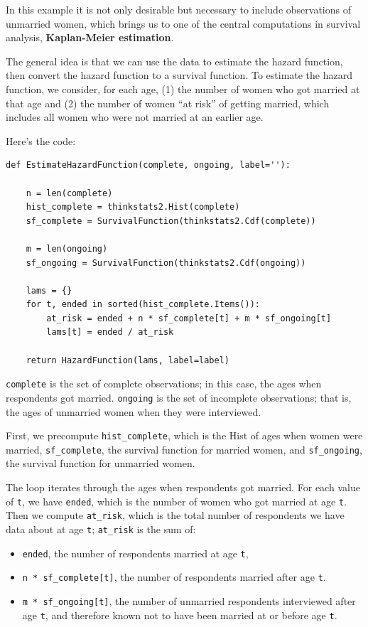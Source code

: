 \documentclass[12pt]{book}
\begin{document}
In this example it is not only desirable but necessary to include
observations of unmarried women, which brings us to one of the central
computations in survival analysis, {\bf Kaplan-Meier estimation}.

The general idea is that we can use the data to estimate the hazard
function, then convert the hazard function to a survival function.
To estimate the hazard function, we consider, for each age,
(1) the number of women who got married at that age and (2) the number
of women ``at risk'' of getting married, which includes all women
who were not married at an earlier age.

Here's the code:

\begin{verbatim}
def EstimateHazardFunction(complete, ongoing, label=''):

    n = len(complete)
    hist_complete = thinkstats2.Hist(complete)
    sf_complete = SurvivalFunction(thinkstats2.Cdf(complete))

    m = len(ongoing)
    sf_ongoing = SurvivalFunction(thinkstats2.Cdf(ongoing))

    lams = {}
    for t, ended in sorted(hist_complete.Items()):
        at_risk = ended + n * sf_complete[t] + m * sf_ongoing[t]
        lams[t] = ended / at_risk

    return HazardFunction(lams, label=label)
\end{verbatim}

{\tt complete} is the set of complete observations; in this case,
the ages when respondents got married.  {\tt ongoing} is the set
of incomplete observations; that is, the ages of unmarried women
when they were interviewed.

First, we precompute \verb"hist_complete", which is the Hist
of ages when women were married, \verb"sf_complete", the
survival function for married women, and \verb"sf_ongoing",
the survival function for unmarried women.

The loop iterates through the ages when respondents got married.
For each value of {\tt t}, we have {\tt ended}, which is the number
of women who got married at age {\tt t}.  Then we compute
\verb"at_risk", which is the total number of respondents we
have data about at age {\tt t};  \verb"at_risk" is the sum
of:

\begin{itemize}

\item {\tt ended}, the number of respondents married at age {\tt t},

\item \verb"n * sf_complete[t]", the number of respondents
married after age {\tt t}.

\item \verb"m * sf_ongoing[t]", the number of unmarried respondents
interviewed after age {\tt t}, and therefore known not to
have been married at or before age {\tt t}.

\end{itemize}
\end{document}

